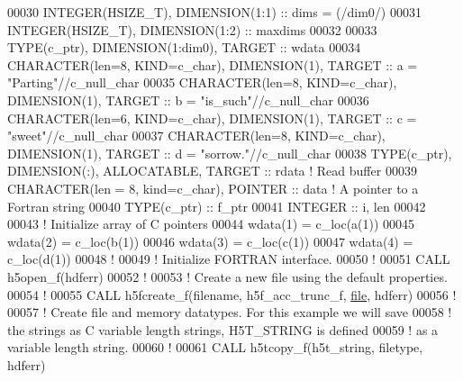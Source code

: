 \begin{DoxyCode}
00030   \textcolor{keywordtype}{INTEGER(HSIZE\_T)}, \textcolor{keywordtype}{DIMENSION(1:1)} :: dims = (/dim0/)
00031   \textcolor{keywordtype}{INTEGER(HSIZE\_T)}, \textcolor{keywordtype}{DIMENSION(1:2)} :: maxdims
00032   
00033   \textcolor{keywordtype}{TYPE}(c\_ptr), \textcolor{keywordtype}{DIMENSION(1:dim0)}, \textcolor{keywordtype}{TARGET} :: wdata
00034   \textcolor{keywordtype}{CHARACTER(len=8, KIND=c\_char)}, \textcolor{keywordtype}{DIMENSION(1)}, \textcolor{keywordtype}{TARGET}  :: a = \textcolor{stringliteral}{"Parting"}//c\_null\_char
00035   \textcolor{keywordtype}{CHARACTER(len=8, KIND=c\_char)}, \textcolor{keywordtype}{DIMENSION(1)}, \textcolor{keywordtype}{TARGET}  :: b = \textcolor{stringliteral}{"is\_such"}//c\_null\_char
00036   \textcolor{keywordtype}{CHARACTER(len=6, KIND=c\_char)}, \textcolor{keywordtype}{DIMENSION(1)}, \textcolor{keywordtype}{TARGET}  :: c = \textcolor{stringliteral}{"sweet"}//c\_null\_char
00037   \textcolor{keywordtype}{CHARACTER(len=8, KIND=c\_char)}, \textcolor{keywordtype}{DIMENSION(1)}, \textcolor{keywordtype}{TARGET}  :: d = \textcolor{stringliteral}{"sorrow."}//c\_null\_char
00038   \textcolor{keywordtype}{TYPE}(c\_ptr), \textcolor{keywordtype}{DIMENSION(:)}, \textcolor{keywordtype}{ALLOCATABLE}, \textcolor{keywordtype}{TARGET} :: rdata \textcolor{comment}{! Read buffer}
00039   \textcolor{keywordtype}{CHARACTER(len = 8, kind=c\_char)},  \textcolor{keywordtype}{POINTER} :: data \textcolor{comment}{! A pointer to a Fortran string}
00040   \textcolor{keywordtype}{TYPE}(c\_ptr) :: f\_ptr
00041   \textcolor{keywordtype}{INTEGER} :: i, len
00042 
00043   \textcolor{comment}{! Initialize array of C pointers}
00044   wdata(1) = c\_loc(a(1))     
00045   wdata(2) = c\_loc(b(1))     
00046   wdata(3) = c\_loc(c(1))     
00047   wdata(4) = c\_loc(d(1))     
00048   \textcolor{comment}{!}
00049   \textcolor{comment}{! Initialize FORTRAN interface.}
00050   \textcolor{comment}{!}
00051   \textcolor{keyword}{CALL }h5open\_f(hdferr)
00052   \textcolor{comment}{!}
00053   \textcolor{comment}{! Create a new file using the default properties.}
00054   \textcolor{comment}{!}
00055   \textcolor{keyword}{CALL }h5fcreate\_f(filename, h5f\_acc\_trunc\_f, \hyperlink{structfile}{file}, hdferr)
00056   \textcolor{comment}{!}
00057   \textcolor{comment}{! Create file and memory datatypes.  For this example we will save}
00058   \textcolor{comment}{! the strings as C variable length strings, H5T\_STRING is defined}
00059   \textcolor{comment}{! as a variable length string.}
00060   \textcolor{comment}{!}
00061   \textcolor{keyword}{CALL }h5tcopy\_f(h5t\_string, filetype, hdferr)

\end{DoxyCode}
